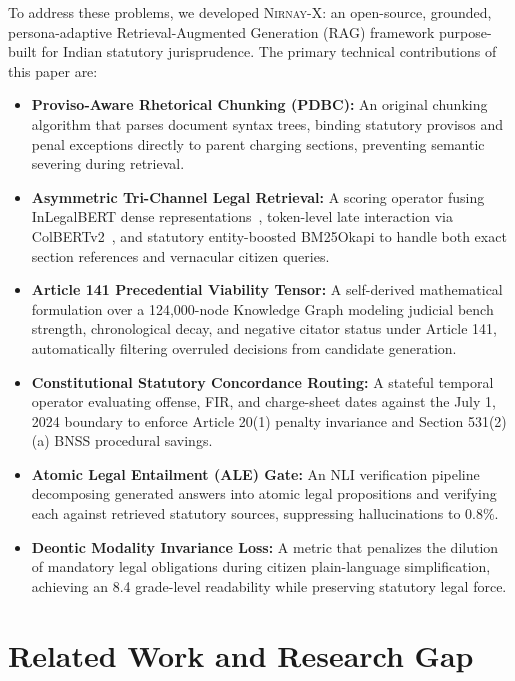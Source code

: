 \documentclass[conference]{IEEEtran}
\begin{document}
To address these problems, we developed \textsc{Nirnay-X}: an open-source, grounded, persona-adaptive Retrieval-Augmented Generation (RAG) framework purpose-built for Indian statutory jurisprudence. The primary technical contributions of this paper are:
\begin{itemize}
    \item \textbf{Proviso-Aware Rhetorical Chunking (PDBC):} An original chunking algorithm that parses document syntax trees, binding statutory provisos and penal exceptions directly to parent charging sections, preventing semantic severing during retrieval.
    \item \textbf{Asymmetric Tri-Channel Legal Retrieval:} A scoring operator fusing InLegalBERT dense representations~\cite{paul2022pre}, token-level late interaction via ColBERTv2~\cite{santhanam2022colbertv2}, and statutory entity-boosted BM25Okapi to handle both exact section references and vernacular citizen queries.
    \item \textbf{Article 141 Precedential Viability Tensor:} A self-derived mathematical formulation over a 124,000-node Knowledge Graph modeling judicial bench strength, chronological decay, and negative citator status under Article 141, automatically filtering overruled decisions from candidate generation.
    \item \textbf{Constitutional Statutory Concordance Routing:} A stateful temporal operator evaluating offense, FIR, and charge-sheet dates against the July 1, 2024 boundary to enforce Article 20(1) penalty invariance and Section 531(2)(a) BNSS procedural savings.
    \item \textbf{Atomic Legal Entailment (ALE) Gate:} An NLI verification pipeline decomposing generated answers into atomic legal propositions and verifying each against retrieved statutory sources, suppressing hallucinations to 0.8\%.
    \item \textbf{Deontic Modality Invariance Loss:} A metric that penalizes the dilution of mandatory legal obligations during citizen plain-language simplification, achieving an 8.4 grade-level readability while preserving statutory legal force.
\end{itemize}

\section{Related Work and Research Gap}
\end{document}
